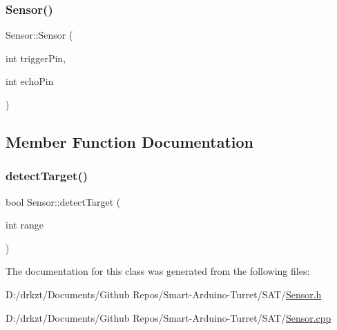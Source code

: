 \mbox{\label{class_sensor_a3f736371574f64dbc9e42eae0c2f6ff6}} 
\subsubsection{\texorpdfstring{Sensor()}{Sensor()}\hspace{0.1cm}{\footnotesize\ttfamily [3/3]}}
{\footnotesize\ttfamily Sensor\+::\+Sensor (\begin{DoxyParamCaption}\item[{int}]{trigger\+Pin,  }\item[{int}]{echo\+Pin }\end{DoxyParamCaption})}



\subsection{Member Function Documentation}
\mbox{\label{class_sensor_a30bad6b427addc330c4ec3136d24f6e8}} 
\subsubsection{\texorpdfstring{detect\+Target()}{detectTarget()}}
{\footnotesize\ttfamily bool Sensor\+::detect\+Target (\begin{DoxyParamCaption}\item[{int}]{range }\end{DoxyParamCaption})}



The documentation for this class was generated from the following files\+:\begin{DoxyCompactItemize}
\item 
D\+:/drkzt/\+Documents/\+Github Repos/\+Smart-\/\+Arduino-\/\+Turret/\+S\+A\+T/\hyperlink{_sensor_8h}{Sensor.\+h}\item 
D\+:/drkzt/\+Documents/\+Github Repos/\+Smart-\/\+Arduino-\/\+Turret/\+S\+A\+T/\hyperlink{_sensor_8cpp}{Sensor.\+cpp}\end{DoxyCompactItemize}
